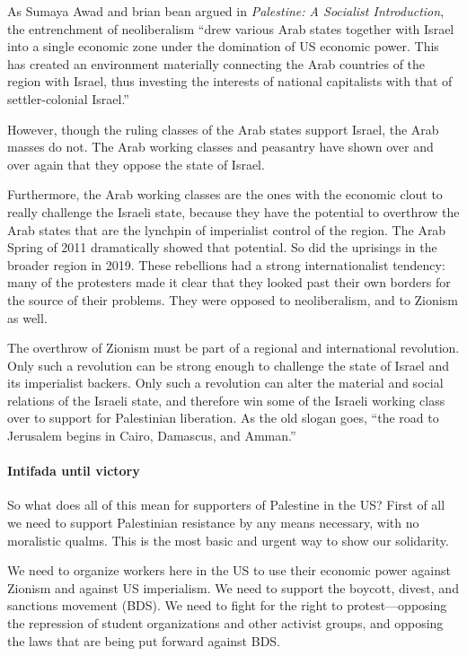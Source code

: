 As Sumaya Awad and brian bean argued in \emph{Palestine: A Socialist Introduction}, the entrenchment of neoliberalism ``drew various Arab states together with Israel into a single economic zone under the domination of US economic power. This has created an environment materially connecting the Arab countries of the region with Israel, thus investing the interests of national capitalists with that of settler-colonial Israel.''

However, though the ruling classes of the Arab states support Israel, the Arab masses do not. The Arab working classes and peasantry have shown over and over again that they oppose the state of Israel.

Furthermore, the Arab working classes are the ones with the economic clout to really challenge the Israeli state, because they have the potential to overthrow the Arab states that are the lynchpin of imperialist control of the region. The Arab Spring of 2011 dramatically showed that potential. So did the uprisings in the broader region in 2019. These rebellions had a strong internationalist tendency: many of the protesters made it clear that they looked past their own borders for the source of their problems. They were opposed to neoliberalism, and to Zionism as well.

The overthrow of Zionism must be part of a regional and international revolution. Only such a revolution can be strong enough to challenge the state of Israel and its imperialist backers. Only such a revolution can alter the material and social relations of the Israeli state, and therefore win some of the Israeli working class over to support for Palestinian liberation. As the old slogan goes, ``the road to Jerusalem begins in Cairo, Damascus, and Amman.''

\paragraph{Intifada until victory}

So what does all of this mean for supporters of Palestine in the US? First of all we need to support Palestinian resistance by any means necessary, with no moralistic qualms. This is the most basic and urgent way to show our solidarity.

We need to organize workers here in the US to use their economic power against Zionism and against US imperialism. We need to support the boycott, divest, and sanctions movement (BDS). We need to fight for the right to protest---opposing the repression of student organizations and other activist groups, and opposing the laws that are being put forward against BDS.

